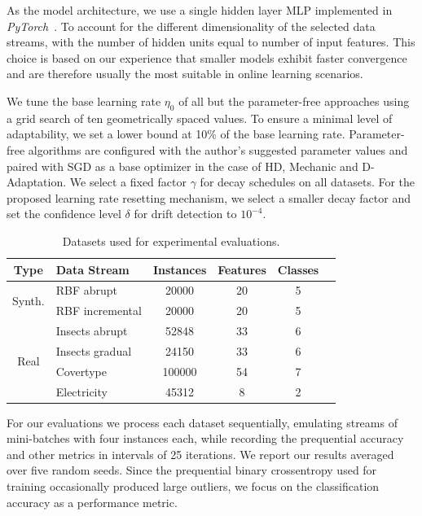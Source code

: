 \documentclass[runningheads]{llncs}
\begin{document}
As the model architecture, we use a single hidden layer MLP implemented in \textit{PyTorch}~\cite{paszkePyTorchImperativeStyle2019}.
To account for the different dimensionality of the selected data streams, with the number of hidden units equal to number of input features.
This choice is based on our experience that smaller models exhibit faster convergence and are therefore usually the most suitable in online learning scenarios.

We tune the base learning rate $\eta_0$ of all but the parameter-free approaches using a grid search of ten geometrically spaced values.
To ensure a minimal level of adaptability, we set a lower bound at 10\% of the base learning rate.
Parameter-free algorithms are configured with the author's suggested parameter values and paired with SGD as a base optimizer in the case of HD, Mechanic and D-Adaptation.
We select a fixed factor $\gamma$ for decay schedules on all datasets.
For the proposed learning rate resetting mechanism, we select a smaller decay factor and set the confidence level $\delta$ for drift detection to $10^{-4}$.
\begin{table}[t]
	\centering
	\scriptsize
	\begin{tabular}{@{}clcccc@{}}
		\toprule
		Type                    & Data Stream               & Instances & Features & Classes \\
		\midrule
		\multirow{2}{*}{Synth.} & RBF abrupt                & 20000     & 20       & 5       \\
		                        & RBF incremental           & 20000     & 20       & 5       \\
		\midrule
		\multirow{5}{*}{Real}   & Insects abrupt            & 52848     & 33       & 6       \\
		                        & Insects gradual           & 24150     & 33       & 6       \\
		                        & Covertype\footnotemark[3] & 100000    & 54       & 7       \\
		                        & Electricity               & 45312     & 8        & 2       \\
		\bottomrule
	\end{tabular}
	\caption{Datasets used for experimental evaluations.}
	\label{tab:datasets}
\end{table}
For our evaluations we process each dataset sequentially, emulating streams of mini-batches with four instances each, while recording the prequential accuracy and other metrics in intervals of 25 iterations.
We report our results averaged over five random seeds.
Since the prequential binary crossentropy used for training occasionally produced large outliers, we focus on the classification accuracy as a performance metric.
\end{document}
